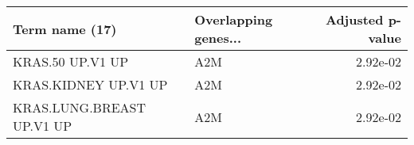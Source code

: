 \begin{tabular}{llr}
\toprule
           Term name (17) & Overlapping genes... &  Adjusted p-value \\
\midrule
         KRAS.50 UP.V1 UP &                  A2M &          2.92e-02 \\
     KRAS.KIDNEY UP.V1 UP &                  A2M &          2.92e-02 \\
KRAS.LUNG.BREAST UP.V1 UP &                  A2M &          2.92e-02 \\
\bottomrule
\end{tabular}
